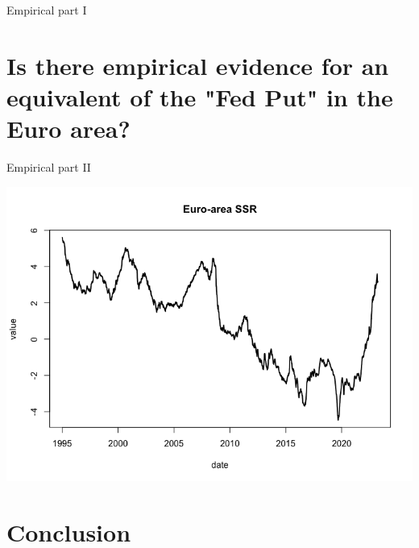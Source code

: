 Empirical part I

\chapter{Is there empirical evidence for an equivalent of the "Fed Put" in the Euro area?}

Empirical part II

\includegraphics[width=\textwidth]{plots/plot_shadow_short_rate_euro_area}

\chapter{Conclusion}


